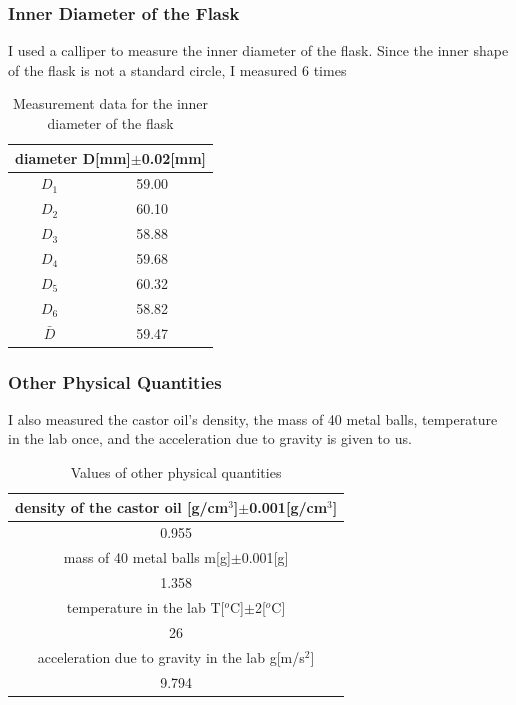 \documentclass[12pt]{article}
\begin{document}
\subsubsection{Inner Diameter of the Flask}
I used a calliper to measure the inner diameter of the flask. Since the inner shape of the flask is not a standard circle, I measured 6 times
\begin{table}[H]
\centering
\begin{tabular}{|c|c|}
\hline
\multicolumn{2}{|c|}{diameter D{[}mm{]}$\pm$0.02{[}mm{]}} \\ \hline
$D_1$                       & 59.00                      \\ \hline
$D_2$                       & 60.10                      \\ \hline
$D_3$                       & 58.88                      \\ \hline
$D_4$                       & 59.68                      \\ \hline
$D_5$                       & 60.32                      \\ \hline
$D_6$                       & 58.82                      \\ \hline
$\bar{D}$                       & 59.47                      \\ \hline
\end{tabular}
\caption{Measurement data for the inner diameter of the flask}
\end{table}
\subsubsection{Other Physical Quantities}
I also measured the castor oil's density, the mass of 40 metal balls, temperature in the lab once, and the acceleration due to gravity is given to us.
\begin{table}[H]
\centering
\begin{tabular}{|c|}
\hline
density of the castor oil {[}g/cm$^3${]}$\pm$0.001{[}g/cm$^3${]}    \\ \hline
0.955                                          \\ \hline
mass of 40 metal balls m{[}g{]}$\pm$0.001{[}g{]}      \\ \hline
1.358                                          \\ \hline
temperature in the lab T{[}$^o$C{]$\pm$}2{[}$^o$C{]}          \\ \hline
26                                             \\ \hline
acceleration due to gravity in the lab g{[}m/s$^2${]} \\ \hline
9.794                                          \\ \hline
\end{tabular}
\caption{Values of other physical quantities}
\end{table}
\end{document}
